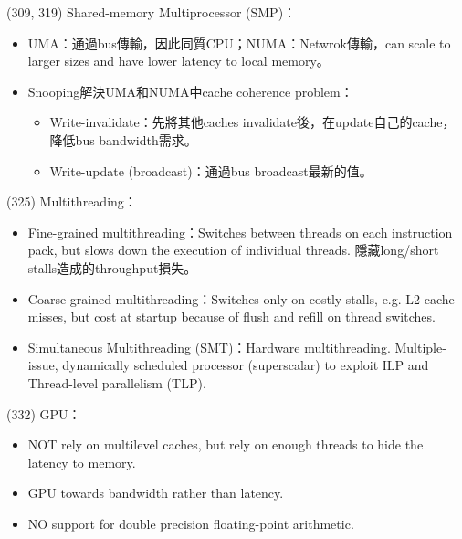 \item \begin{theorem}{(309, 319)} Shared-memory Multiprocessor (SMP)：\begin{itemize}
        \item UMA：通過bus傳輸，因此同質CPU；NUMA：Netwrok傳輸，can scale to larger sizes and have lower latency to local memory。
        \item Snooping解決UMA和NUMA中cache coherence problem：\begin{itemize}
            \item Write-invalidate：先將其他caches invalidate後，在update自己的cache，降低bus bandwidth需求。
            \item Write-update (broadcast)：通過bus broadcast最新的值。
        \end{itemize}
    \end{itemize}
\end{theorem}

\item \begin{theorem}{(325)} Multithreading： \begin{itemize}
        \item Fine-grained multithreading：Switches between threads on each instruction pack, but slows down the execution of individual threads. 隱藏long/short stalls造成的throughput損失。
        \item Coarse-grained multithreading：Switches only on costly stalls, e.g. L2 cache misses, but cost at startup because of flush and refill on thread switches.
        \item Simultaneous Multithreading (SMT)：Hardware multithreading. Multiple-issue, dynamically scheduled processor (superscalar) to exploit ILP and Thread-level parallelism (TLP).
    \end{itemize}
\end{theorem}

\item \begin{theorem}{(332)} GPU：\begin{itemize}
        \item NOT rely on multilevel caches, but rely on enough threads to hide the latency to memory.
        \item GPU towards bandwidth rather than latency.
        \item NO support for double precision floating-point arithmetic.
    \end{itemize}
\end{theorem}
